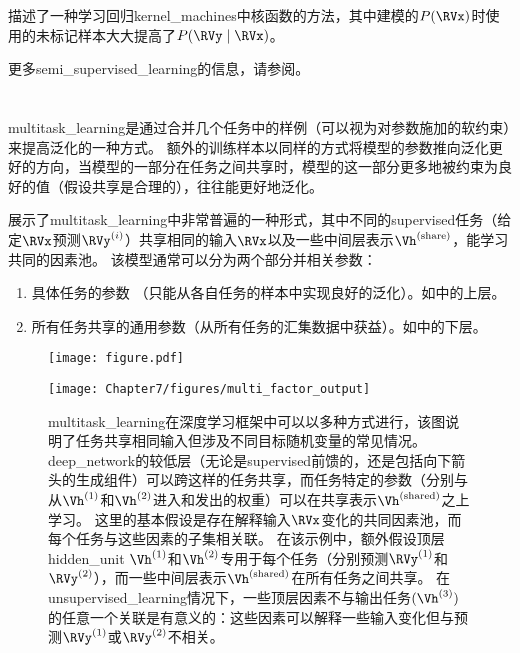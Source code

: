 \cite{Russ+Geoff-nips-2007}描述了一种学习回归\gls{kernel_machines}中核函数的方法，其中建模的$P(\RVx)$时使用的未标记样本大大提高了$P(\RVy \mid \RVx)$。

更多\gls{semi_supervised_learning}的信息，请参阅\cite{SSL-Book-2006}。

\section{}
\label{sec:multitask_learning}
\gls{multitask_learning}\citep{caruana93a}是通过合并几个任务中的样例（可以视为对参数施加的软约束）来提高泛化的一种方式。
额外的训练样本以同样的方式将模型的参数推向泛化更好的方向，当模型的一部分在任务之间共享时，模型的这一部分更多地被约束为良好的值（假设共享是合理的），往往能更好地泛化。

展示了\gls{multitask_learning}中非常普遍的一种形式，其中不同的\gls{supervised}任务（给定$\RVx$预测$\RVy^{(i)}$）共享相同的输入$\RVx$以及一些中间层表示$\Vh^{(\text{share})}$，能学习共同的因素池。
该模型通常可以分为两个部分并相关参数：
\begin{enumerate}
 \item 具体任务的参数 （只能从各自任务的样本中实现良好的泛化）。如中的上层。
 \item 所有任务共享的通用参数（从所有任务的汇集数据中获益）。如中的下层。
\end{enumerate}
\begin{figure}[!htb]
\ifOpenSource
\centerline{\texttt{[image: figure.pdf]}}
\else
\centerline{\texttt{[image: Chapter7/figures/multi\_factor\_output]}}
\fi
\caption{\gls{multitask_learning}在深度学习框架中可以以多种方式进行，该图说明了任务共享相同输入但涉及不同目标随机变量的常见情况。
\gls{deep_network}的较低层（无论是\gls{supervised}前馈的，还是包括向下箭头的生成组件）可以跨这样的任务共享，而任务特定的参数（分别与从$\Vh^{(1)}$和$\Vh^{(2)}$进入和发出的权重）可以在共享表示$\Vh^{(\text{shared})}$之上学习。
这里的基本假设是存在解释输入$\RVx$变化的共同因素池，而每个任务与这些因素的子集相关联。
在该示例中，额外假设顶层\gls{hidden_unit} $\Vh^{(1)}$和$\Vh^{(2)}$专用于每个任务（分别预测$\RVy^{(1)}$和$\RVy^{(2)}$），而一些中间层表示$\Vh^{(\text{shared})}$在所有任务之间共享。
在\gls{unsupervised_learning}情况下，一些顶层因素不与输出任务$(\Vh^{(3)})$的任意一个关联是有意义的：这些因素可以解释一些输入变化但与预测$\RVy^{(1)}$或$\RVy^{(2)}$不相关。
}
\label{fig:chap7_multi_factor_output}
\end{figure}

